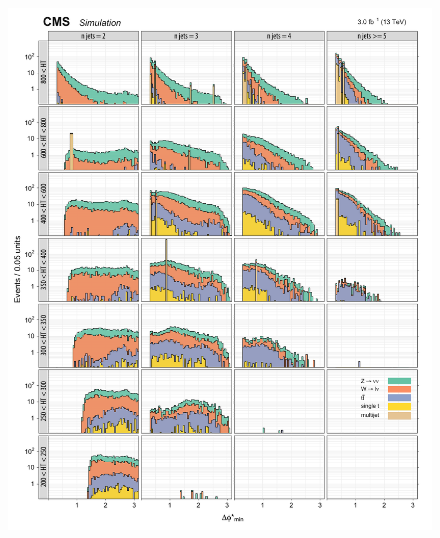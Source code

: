 \begin{figure}[!h]
\centering
\includegraphics[scale=0.95]{figures/kiplots/c150107_s150318_f015_biasedDPhi_100}
\end{figure}

